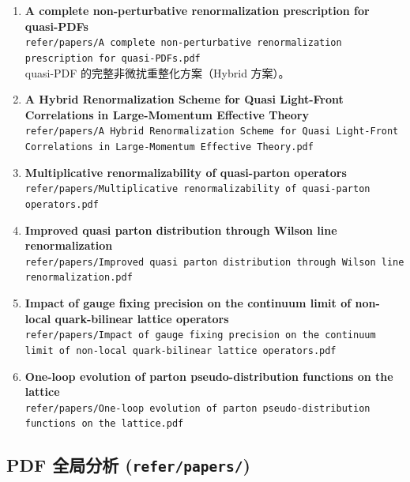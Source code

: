\documentclass[12pt,a4paper]{ctexart}
\begin{document}
\begin{enumerate}
    \item \textbf{A complete non-perturbative renormalization prescription for quasi-PDFs} \\
    \texttt{refer/papers/A complete non-perturbative renormalization prescription for quasi-PDFs.pdf} \\
    quasi-PDF 的完整非微扰重整化方案（Hybrid 方案）。

    \item \textbf{A Hybrid Renormalization Scheme for Quasi Light-Front Correlations in Large-Momentum Effective Theory} \\
    \texttt{refer/papers/A Hybrid Renormalization Scheme for Quasi Light-Front Correlations in Large-Momentum Effective Theory.pdf}

    \item \textbf{Multiplicative renormalizability of quasi-parton operators} \\
    \texttt{refer/papers/Multiplicative renormalizability of quasi-parton operators.pdf}

    \item \textbf{Improved quasi parton distribution through Wilson line renormalization} \\
    \texttt{refer/papers/Improved quasi parton distribution through Wilson line renormalization.pdf}

    \item \textbf{Impact of gauge fixing precision on the continuum limit of non-local quark-bilinear lattice operators} \\
    \texttt{refer/papers/Impact of gauge fixing precision on the continuum limit of non-local quark-bilinear lattice operators.pdf}

    \item \textbf{One-loop evolution of parton pseudo-distribution functions on the lattice} \\
    \texttt{refer/papers/One-loop evolution of parton pseudo-distribution functions on the lattice.pdf}
\end{enumerate}

\subsection{PDF 全局分析 (\texttt{refer/papers/})}
\end{document}
